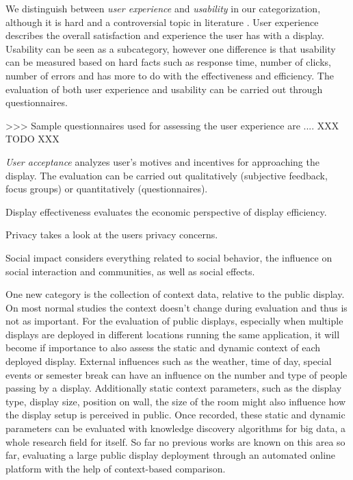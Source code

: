 


	We distinguish between \textit{user experience} and \textit{usability} in our categorization, although it is hard and a controversial topic in literature \cite{bevan2009difference}.
	User experience describes the overall satisfaction and experience the user has with a display. Usability can be seen as a subcategory, however one difference is that usability can be measured based on hard facts such as response time, number of clicks, number of errors and has more to do with the effectiveness and efficiency. The evaluation of both user experience and usability can be carried out through questionnaires.

		>>> Sample questionnaires used for assessing the user 	experience are .... XXX TODO XXX


		\textit{User acceptance} analyzes user's motives and incentives for approaching the display. The evaluation can be carried out qualitatively (subjective feedback, focus groups) or quantitatively (questionnaires).

		Display effectiveness evaluates the economic perspective of display efficiency. 

		Privacy takes a look at the users privacy concerns.

		Social impact considers everything related to social behavior, the influence on social interaction and communities, as well as social effects.


		One new category is the collection of context data, relative to the public display. On most normal studies the context doesn't change during evaluation and thus is not as important. For the evaluation of public displays, especially when multiple displays are deployed in different locations running the same application, it will become if importance to also assess the static and dynamic context of each deployed display. External influences such as the weather, time of day, special events or semester break can have an influence on the number and type of people passing by a display. Additionally static context parameters, such as the display type, display size, position on wall, the size of the room might also influence how the display setup is perceived in public. Once recorded, these static and dynamic parameters can be evaluated with knowledge discovery algorithms for big data, a whole research field for itself. 
		So far no previous works are known on this area so far, evaluating a large public display deployment through an automated online platform with the help of context-based comparison. 

